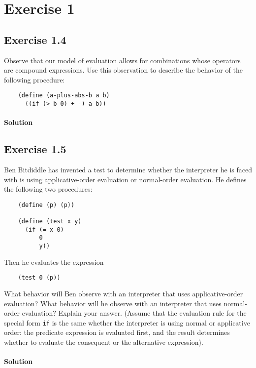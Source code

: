 \section*{Exercise 1}

\subsection*{Exercise 1.4}
Observe that our model of evaluation allows for combinations whose operators are compound expressions. Use this observation to 
describe the behavior of the following procedure:

\begin{lstlisting}
    (define (a-plus-abs-b a b) 
      ((if (> b 0) + -) a b))
\end{lstlisting}

\paragraph{Solution}


\subsection*{Exercise 1.5}
Ben Bitdiddle has invented a test to determine whether the interpreter he is faced with is using applicative-order evaluation 
or normal-order evaluation. He defines the following two procedures:

\begin{lstlisting}
    (define (p) (p))

    (define (test x y)
      (if (= x 0)
          0
          y))
\end{lstlisting}

Then he evaluates the expression

\begin{lstlisting}
    (test 0 (p))
\end{lstlisting}

What behavior will Ben observe with an interpreter that uses applicative-order evaluation? What behavior will he
observe with an interpreter that uses normal-order evaluation? Explain your answer. (Assume that the evaluation
rule for the special form \texttt{if} is the same whether the interpreter is using normal or applicative order: the predicate 
expression is evaluated first, and the result determines whether to evaluate the consequent or the alternative expression).

\paragraph{Solution}